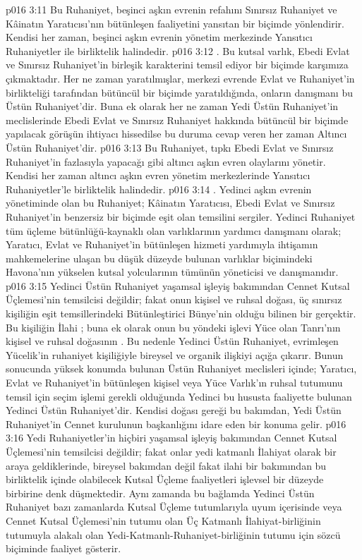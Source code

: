 \vs p016 3:11 Bu Ruhaniyet, beşinci aşkın evrenin refahını Sınırsız Ruhaniyet ve Kâinatın Yaratıcısı’nın bütünleşen faaliyetini yansıtan bir biçimde yönlendirir. Kendisi her zaman, beşinci aşkın evrenin yönetim merkezinde Yansıtıcı Ruhaniyetler ile birliktelik halindedir.
\vs p016 3:12 . Bu kutsal varlık, Ebedi Evlat ve Sınırsız Ruhaniyet’in birleşik karakterini temsil ediyor bir biçimde karşımıza çıkmaktadır. Her ne zaman yaratılmışlar, merkezi evrende Evlat ve Ruhaniyet’in birlikteliği tarafından bütüncül bir biçimde yaratıldığında, onların danışmanı bu Üstün Ruhaniyet’dir. Buna ek olarak her ne zaman Yedi Üstün Ruhaniyet’in meclislerinde Ebedi Evlat ve Sınırsız Ruhaniyet hakkında bütüncül bir biçimde yapılacak görüşün ihtiyacı hissedilse bu duruma cevap veren her zaman Altıncı Üstün Ruhaniyet’dir.
\vs p016 3:13 Bu Ruhaniyet, tıpkı Ebedi Evlat ve Sınırsız Ruhaniyet’in fazlasıyla yapacağı gibi altıncı aşkın evren olaylarını yönetir. Kendisi her zaman altıncı aşkın evren yönetim merkezlerinde Yansıtıcı Ruhaniyetler’le birliktelik halindedir.
\vs p016 3:14 . Yedinci aşkın evrenin yönetiminde olan bu Ruhaniyet; Kâinatın Yaratıcısı, Ebedi Evlat ve Sınırsız Ruhaniyet’in benzersiz bir biçimde eşit olan temsilini sergiler. Yedinci Ruhaniyet tüm üçleme bütünlüğü\hyp{}kaynaklı olan varlıklarının yardımcı danışmanı olarak; Yaratıcı, Evlat ve Ruhaniyet’in bütünleşen hizmeti yardımıyla ihtişamın mahkemelerine ulaşan bu düşük düzeyde bulunan varlıklar biçimindeki Havona’nın yükselen kutsal yolcularının tümünün yöneticisi ve danışmanıdır.
\vs p016 3:15 Yedinci Üstün Ruhaniyet yaşamsal işleyiş bakımından Cennet Kutsal Üçlemesi’nin temsilcisi değildir; fakat onun kişisel ve ruhsal doğası, üç sınırsız kişiliğin eşit temsillerindeki Bütünleştirici Bünye’nin  olduğu bilinen bir gerçektir. Bu kişiliğin İlahi ; buna ek olarak onun bu yöndeki işlevi Yüce olan Tanrı’nın kişisel ve ruhsal doğasının . Bu nedenle Yedinci Üstün Ruhaniyet, evrimleşen Yücelik’in ruhaniyet kişiliğiyle bireysel ve organik ilişkiyi açığa çıkarır. Bunun sonucunda yüksek konumda bulunan Üstün Ruhaniyet meclisleri içinde; Yaratıcı, Evlat ve Ruhaniyet’in bütünleşen kişisel veya Yüce Varlık’ın ruhsal tutumunu temsil için seçim işlemi gerekli olduğunda Yedinci bu hususta faaliyette bulunan Yedinci Üstün Ruhaniyet’dir. Kendisi doğası gereği bu bakımdan, Yedi Üstün Ruhaniyet’in Cennet kurulunun başkanlığını idare eden bir konuma gelir.
\vs p016 3:16 Yedi Ruhaniyetler’in hiçbiri yaşamsal işleyiş bakımından Cennet Kutsal Üçlemesi’nin temsilcisi değildir; fakat onlar yedi katmanlı İlahiyat olarak bir araya geldiklerinde, bireysel bakımdan değil fakat ilahi bir bakımından bu birliktelik içinde olabilecek Kutsal Üçleme faaliyetleri işlevsel bir düzeyde birbirine denk düşmektedir. Aynı zamanda bu bağlamda Yedinci Üstün Ruhaniyet bazı zamanlarda Kutsal Üçleme tutumlarıyla uyum içerisinde veya Cennet Kutsal Üçlemesi’nin tutumu olan Üç Katmanlı İlahiyat\hyp{}birliğinin tutumuyla alakalı olan Yedi\hyp{}Katmanlı\hyp{}Ruhaniyet\hyp{}birliğinin tutumu için sözcü biçiminde faaliyet gösterir.
